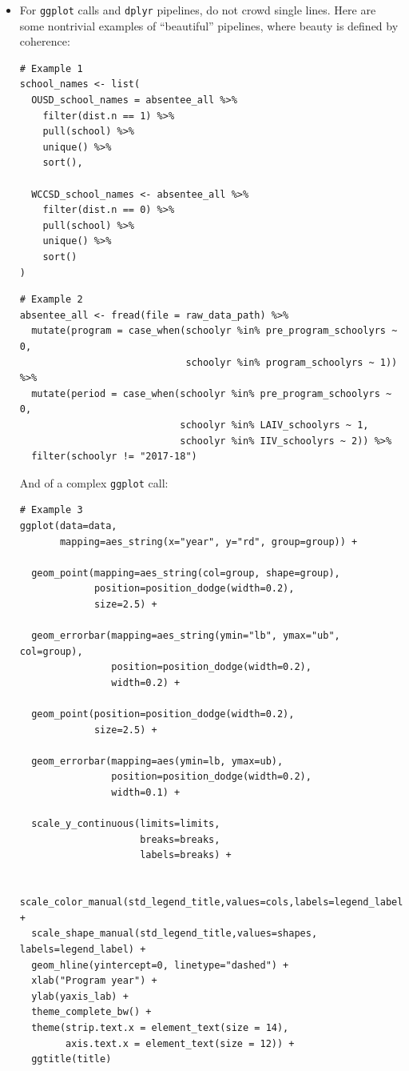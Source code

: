 \documentclass[
]{book}
\begin{document}
\begin{itemize}
\item
  For \texttt{ggplot} calls and \texttt{dplyr} pipelines, do not crowd single lines. Here are some nontrivial examples of ``beautiful'' pipelines, where beauty is defined by coherence:

\begin{verbatim}
# Example 1
school_names <- list(
  OUSD_school_names = absentee_all %>%
    filter(dist.n == 1) %>%
    pull(school) %>%
    unique() %>%
    sort(),

  WCCSD_school_names <- absentee_all %>%
    filter(dist.n == 0) %>%
    pull(school) %>%
    unique() %>%
    sort()
)
\end{verbatim}

\begin{verbatim}
# Example 2
absentee_all <- fread(file = raw_data_path) %>%
  mutate(program = case_when(schoolyr %in% pre_program_schoolyrs ~ 0,
                             schoolyr %in% program_schoolyrs ~ 1)) %>%
  mutate(period = case_when(schoolyr %in% pre_program_schoolyrs ~ 0,
                            schoolyr %in% LAIV_schoolyrs ~ 1,
                            schoolyr %in% IIV_schoolyrs ~ 2)) %>%
  filter(schoolyr != "2017-18")
\end{verbatim}

  And of a complex \texttt{ggplot} call:

\begin{verbatim}
# Example 3
ggplot(data=data,
       mapping=aes_string(x="year", y="rd", group=group)) +

  geom_point(mapping=aes_string(col=group, shape=group),
             position=position_dodge(width=0.2),
             size=2.5) +

  geom_errorbar(mapping=aes_string(ymin="lb", ymax="ub", col=group),
                position=position_dodge(width=0.2),
                width=0.2) +

  geom_point(position=position_dodge(width=0.2),
             size=2.5) +

  geom_errorbar(mapping=aes(ymin=lb, ymax=ub),
                position=position_dodge(width=0.2),
                width=0.1) +

  scale_y_continuous(limits=limits,
                     breaks=breaks,
                     labels=breaks) +

  scale_color_manual(std_legend_title,values=cols,labels=legend_label) +
  scale_shape_manual(std_legend_title,values=shapes, labels=legend_label) +
  geom_hline(yintercept=0, linetype="dashed") +
  xlab("Program year") +
  ylab(yaxis_lab) +
  theme_complete_bw() +
  theme(strip.text.x = element_text(size = 14),
        axis.text.x = element_text(size = 12)) +
  ggtitle(title)
\end{verbatim}
\end{itemize}
\end{document}
